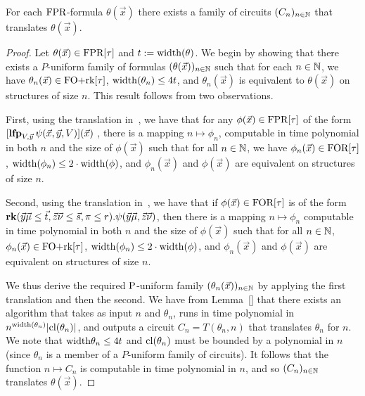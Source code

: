 \documentclass[../paper.tex]{subfiles}
\begin{document}
\begin{thm}
  For each $\text{\upshape FPR}$-formula $\theta(\vec{x})$ there exists a family of circuits
  $(C_n)_{n \in \mathbb{N}}$ that translates $\theta(\vec{x})$.
  \label{thm:translating-formulas-to-circuits}
\end{thm}
\begin{proof}
  Let $\theta(\vec{x}) \in \text{\upshape FPR}[\tau]$ and $t := \mathrm{width} (\theta)$. We begin by
  showing that there exists a $P$-uniform family of formulas
  $(\theta(\vec{x}))_{n \in \mathbb{N}}$ such that for each $n \in \mathbb{N}$, we have
  $\theta_n(\vec{x}) \in \text{\upshape FO+rk}[\tau]$, $\mathrm{width}(\theta_n) \leq 4 t$, and
  $\theta_n(\vec{x})$ is equivalent to $\theta(\vec{x})$ on structures of size
  $n$. This result follows from two observations.

  First, using the translation in~\cite{Dawar09logicswith}, we have that for any
  $\phi(\vec{x}) \in \text{\upshape FPR}[\tau]$ of the form $[\text{\textbf{lfp}}_{V, \vec{y}} \, \psi(\vec{x},
    \vec{y}, V) ](\vec{x})$ , there is a mapping $n \mapsto \phi_n$, computable
  in time polynomial in both $n$ and the size of $\phi(\vec{x})$ such that for
  all $n \in \mathbb{N}$, we have $\phi_n(\vec{x}) \in \text{\upshape FOR}[\tau]$, $\mathrm{width} (\phi_n)
  \leq 2 \cdot \mathrm{width} (\phi)$, and $\phi_n(\vec{x})$ and $\phi(\vec{x})$ are
  equivalent on structures of size $n$.

  Second, using the translation in~\cite{libkin2004elements}, we have that if
  $\phi (\vec{x}) \in \text{\upshape FOR}[\tau]$ is of the form $\text{\textbf{rk}} (\vec{y}\vec{\mu} \leq
  \vec{t}, \vec{z}\vec{\nu} \leq \vec{s}, \pi \leq r) . \psi (\vec{y}\vec{\mu},
  \vec{z} \vec{\nu})$, then there is a mapping $n \mapsto \phi_n$ computable in
  time polynomial in both $n$ and the size of $\phi(\vec{x})$ such that for all
  $n \in \mathbb{N}$, $\phi_n(\vec{x}) \in \text{\upshape FO+rk}[\tau]$, $\mathrm{width}(\phi_n) \leq 2 \cdot
  \mathrm{width}(\phi)$, and $\phi_n(\vec{x})$ and $\phi(\vec{x})$ are equivalent on
  structures of size $n$.

  We thus derive the required $\mathrm{P}$-uniform family $(\theta_n(\vec{x}))_{n \in
    \mathbb{N}}$ by applying the first translation and then the second. We have from
  Lemma~\ref{} that there exists an algorithm that takes as input $n$ and
  $\theta_n$, runs in time polynomial in $n^{\mathrm{width}(\theta_n)} \vert
  \mathrm{cl}(\theta_n) \vert$, and outputs a circuit $C_n = T(\theta_n, n)$ that
  translates $\theta_n$ for $n$. We note that $\mathrm{width}{\theta_n} \leq 4t$ and
  $\mathrm{cl}(\theta_n)$ must be bounded by a polynomial in $n$ (since $\theta_n$ is a
  member of a $P$-uniform family of circuits). It follows that the function $n
  \mapsto C_n$ is computable in time polynomial in $n$, and so $(C_n)_{n \in
    \mathbb{N}}$ translates $\theta(\vec{x})$.
\end{proof}
\end{document}
